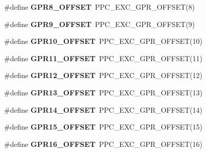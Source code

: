 \begin{DoxyCompactItemize}
\#define {\bfseries G\+P\+R8\+\_\+\+O\+F\+F\+S\+ET}~P\+P\+C\+\_\+\+E\+X\+C\+\_\+\+G\+P\+R\+\_\+\+O\+F\+F\+S\+ET(8)
\item 
\mbox{\label{group__RTEMSScoreCPUPowerPC_gaf7d142d9dbfec551d48c240820ff2dc3}} 
\#define {\bfseries G\+P\+R9\+\_\+\+O\+F\+F\+S\+ET}~P\+P\+C\+\_\+\+E\+X\+C\+\_\+\+G\+P\+R\+\_\+\+O\+F\+F\+S\+ET(9)
\item 
\mbox{\label{group__RTEMSScoreCPUPowerPC_ga4ed031b18d0c670a3656e42c3a57ff1d}} 
\#define {\bfseries G\+P\+R10\+\_\+\+O\+F\+F\+S\+ET}~P\+P\+C\+\_\+\+E\+X\+C\+\_\+\+G\+P\+R\+\_\+\+O\+F\+F\+S\+ET(10)
\item 
\mbox{\label{group__RTEMSScoreCPUPowerPC_ga7a20d547b98378104687c4961eb7c63b}} 
\#define {\bfseries G\+P\+R11\+\_\+\+O\+F\+F\+S\+ET}~P\+P\+C\+\_\+\+E\+X\+C\+\_\+\+G\+P\+R\+\_\+\+O\+F\+F\+S\+ET(11)
\item 
\mbox{\label{group__RTEMSScoreCPUPowerPC_gaddf044103cc412260e35a8f053d6fcb8}} 
\#define {\bfseries G\+P\+R12\+\_\+\+O\+F\+F\+S\+ET}~P\+P\+C\+\_\+\+E\+X\+C\+\_\+\+G\+P\+R\+\_\+\+O\+F\+F\+S\+ET(12)
\item 
\mbox{\label{group__RTEMSScoreCPUPowerPC_gaf7897b013657708bf89def3abf0bffbc}} 
\#define {\bfseries G\+P\+R13\+\_\+\+O\+F\+F\+S\+ET}~P\+P\+C\+\_\+\+E\+X\+C\+\_\+\+G\+P\+R\+\_\+\+O\+F\+F\+S\+ET(13)
\item 
\mbox{\label{group__RTEMSScoreCPUPowerPC_gac73e48b504259a8989145b957f157f60}} 
\#define {\bfseries G\+P\+R14\+\_\+\+O\+F\+F\+S\+ET}~P\+P\+C\+\_\+\+E\+X\+C\+\_\+\+G\+P\+R\+\_\+\+O\+F\+F\+S\+ET(14)
\item 
\mbox{\label{group__RTEMSScoreCPUPowerPC_ga0b31d9831ec88f546d83c902c97bb604}} 
\#define {\bfseries G\+P\+R15\+\_\+\+O\+F\+F\+S\+ET}~P\+P\+C\+\_\+\+E\+X\+C\+\_\+\+G\+P\+R\+\_\+\+O\+F\+F\+S\+ET(15)
\item 
\mbox{\label{group__RTEMSScoreCPUPowerPC_ga9e0f03ca4ac5466a02096845e5b2dc64}} 
\#define {\bfseries G\+P\+R16\+\_\+\+O\+F\+F\+S\+ET}~P\+P\+C\+\_\+\+E\+X\+C\+\_\+\+G\+P\+R\+\_\+\+O\+F\+F\+S\+ET(16)

\end{DoxyCompactItemize}
